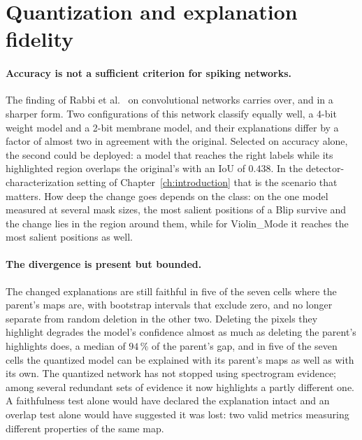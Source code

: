 \section{Quantization and explanation fidelity}

\paragraph{Accuracy is not a sufficient criterion for spiking networks.}
The finding of Rabbi et al.~\cite{rabbi2026} on convolutional networks carries
over, and in a sharper form. Two configurations of this network classify equally
well, a 4-bit weight model and a 2-bit membrane model, and their explanations
differ by a factor of almost two in agreement with the original. Selected on
accuracy alone, the second could be deployed: a model that reaches the right
labels while its highlighted region overlaps the original's with an IoU of
$0.438$. In the detector-characterization setting of
Chapter~\ref{ch:introduction} that is the scenario that matters. How deep the
change goes depends on the class: on the one model measured at several mask
sizes, the most salient positions of a Blip survive and the change lies in the
region around them, while for Violin\_Mode it reaches the most salient positions
as well.

\paragraph{The divergence is present but bounded.} The changed explanations are
still faithful in five of the seven cells where the parent's maps are, with
bootstrap intervals that exclude zero, and no longer separate from random
deletion in the other two. Deleting the pixels they highlight degrades the model's
confidence almost as much as deleting the parent's highlights does, a median of
$94\,\%$ of the parent's gap, and in five of the seven cells the quantized model
can be explained with its parent's maps as well as with its own. The quantized network has not stopped
using spectrogram evidence; among several redundant sets of evidence it now
highlights a partly different one. A faithfulness test alone would have declared
the explanation intact and an overlap test alone would have suggested it was
lost: two valid metrics measuring different properties of the same map.

